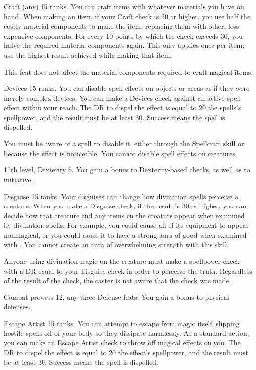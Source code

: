 \featpre Craft (any) 15 ranks.
\featben You can craft items with whatever materials you have on hand.
When making an item, if your Craft check is 30 or higher, you use half the costly material components to make the item, replacing them with other, less expensive components.
For every 10 points by which the check exceeds 30, you halve the required material components again.
This only applies once per item; use the highest result achieved while making that item.

This feat does not affect the material components required to craft magical items.

\featpre Devices 15 ranks.
\featben You can disable spell effects on objects or areas as if they were merely complex devices.
You can make a Devices check against an active spell effect within your reach.
The DR to dispel the effect is equal to 20 \add the spells's spellpower, and the result must be at least 30.
Success means the spell is dispelled.

You must be aware of a spell to disable it, either through the Spellcraft skill or because the effect is noticeable.
You cannot disable spell effects on creatures.

\featpres 11th level, Dexterity 6.
\featben You gain a  bonus to Dexterity-based checks, as well as to initiative.

\featpre Disguise 15 ranks.
\featben Your disguises can change how divination spells perceive a creature.
When you make a Disguise check, if the result is 30 or higher, you can decide how that creature and any items on the creature appear when examined by divination spells.
For example, you could cause all of its equipment to appear nonmagical, or you could cause it to have a strong aura of good when examined with .
You cannot create an aura of overwhelming strength with this skill.

Anyone using divination magic on the creature must make a spellpower check with a DR equal to your Disguise check in order to perceive the truth.
Regardless of the result of the check, the caster is not aware that the check was made.

\featpres Combat prowess 12, any three Defense feats.
\featben You gain a  bonus to physical defenses.

\featpre Escape Artist 15 ranks.
\featben You can attempt to escape from magic itself, slipping hostile spells off of your body so they dissipate harmlessly.
As a standard action, you can make an Escape Artist check to throw off magical effects on you.
The DR to dispel the effect is equal to 20 \add the effect's spellpower, and the result must be at least 30.
Success means the spell is dispelled.

